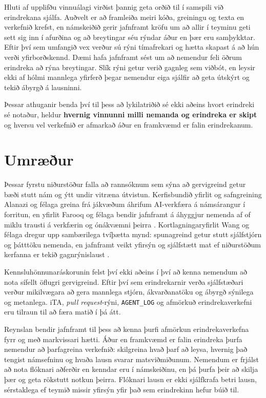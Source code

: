 \documentclass{kennsluakademia_conf}
\begin{document}
Hluti af upplifðu vinnuálagi virðist þannig geta orðið til í samspili
við erindrekana sjálfa. Auðvelt er að framleiða meiri kóða, greiningu og
texta en verkefnið krefst, en námskeiðið gerir jafnframt kröfu um að
allir í teyminu geti sett sig inn í afurðina og að breytingar séu rýndar
áður en þær eru samþykktar. Eftir því sem umfangið vex verður sú rýni
tímafrekari og hætta skapast á að hún verði yfirborðskennd. Dæmi hafa
jafnframt sést um að nemendur feli öðrum erindreka að rýna breytingar.
Slík rýni getur verið gagnleg sem viðbót, en leysir ekki af hólmi
mannlega yfirferð þegar nemendur eiga sjálfir að geta útskýrt og tekið
ábyrgð á lausninni.

Þessar athuganir benda því til þess að lykilatriðið sé ekki aðeins hvort
erindreki sé notaður, heldur \textbf{hvernig vinnunni milli nemanda og
erindreka er skipt} og hversu vel verkefnið er afmarkað áður en
framkvæmd er falin erindrekanum.

\section{Umræður}\label{umruxe6uxf0ur}

Þessar fyrstu niðurstöður falla að rannsóknum sem sýna að gervigreind
getur bæði stutt nám og ýtt undir vitræna útvistun. Kerfisbundið yfirlit
og safngreining Alanazi og félaga greina frá jákvæðum áhrifum
AI-verkfæra á námsárangur í forritun, en yfirlit Farooq og félaga bendir
jafnframt á áhyggjur nemenda af of miklu trausti á verkfærin og
ónákvæmni þeirra \citep{alanazi2025, farooq2026}. Kortlagningaryfirlit
Wang og félaga dregur upp sambærilega tvíþætta mynd: spunagreind getur
stutt sjálfstjórn og þátttöku nemenda, en jafnframt veikt yfirsýn og
sjálfstætt mat ef niðurstöðum kerfanna er tekið gagnrýnislaust
\citep{wang2026}.

Kennsluhönnunaráskorunin felst því ekki aðeins í því að kenna nemendum
að nota sífellt öflugri gervigreind. Eftir því sem erindrekarnir verða
sjálfstæðari verður mikilvægara að gera mannlega stjórn, ákvarðanatöku
og ábyrgð sýnilega og metanlega. iTA, \emph{pull request}-rýni,
\texttt{AGENT\_LOG} og afmörkuð erindrekaverkefni eru tilraun til að
færa matið í þá átt.

Reynslan bendir jafnframt til þess að kenna þurfi afmörkun
erindrekaverkefna fyrr og með markvissari hætti. Áður en framkvæmd er
falin erindreka þurfa nemendur að þarfagreina verkefnið: skilgreina hvað
þarf að leysa, hvernig það tengist námsefninu og hvaða lausn svarar
matsviðmiðunum. Nemendum er frjálst að nota flóknari aðferðir en kenndar
eru í námskeiðinu, en þá þurfa þeir að skilja þær og geta rökstutt
notkun þeirra. Flóknari lausn er ekki sjálfkrafa betri lausn,
sérstaklega ef teymið missir yfirsýn yfir það sem erindrekinn hefur búið
til.
\end{document}
